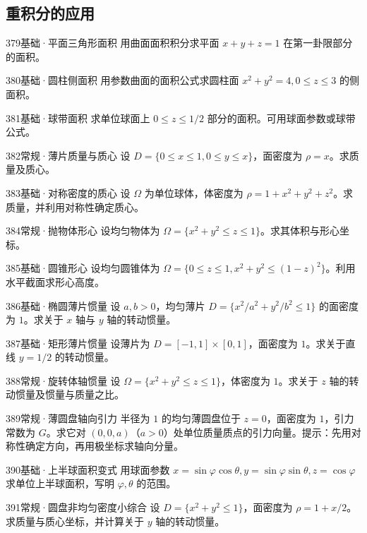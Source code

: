 \subsection{重积分的应用}
\begin{exercise}{379}{基础·平面三角形面积}
用曲面面积积分求平面 $x+y+z=1$ 在第一卦限部分的面积。
\end{exercise}
\begin{exercise}{380}{基础·圆柱侧面积}
用参数曲面的面积公式求圆柱面 $x^2+y^2=4,0\leq z\leq3$ 的侧面积。
\end{exercise}
\begin{exercise}{381}{基础·球带面积}
求单位球面上 $0\leq z\leq1/2$ 部分的面积。可用球面参数或球带公式。
\end{exercise}
\begin{exercise}{382}{常规·薄片质量与质心}
设 $D=\{0\leq x\leq1,0\leq y\leq x\}$，面密度为 $\rho=x$。求质量及质心。
\end{exercise}
\begin{exercise}{383}{基础·对称密度的质心}
设 $\Omega$ 为单位球体，体密度为 $\rho=1+x^2+y^2+z^2$。求质量，并利用对称性确定质心。
\end{exercise}
\begin{exercise}{384}{常规·抛物体形心}
设均匀物体为 $\Omega=\{x^2+y^2\leq z\leq1\}$。求其体积与形心坐标。
\end{exercise}
\begin{exercise}{385}{基础·圆锥形心}
设均匀圆锥体为 $\Omega=\{0\leq z\leq1,x^2+y^2\leq(1-z)^2\}$。利用水平截面求形心高度。
\end{exercise}
\begin{exercise}{386}{基础·椭圆薄片惯量}
设 $a,b>0$，均匀薄片 $D=\{x^2/a^2+y^2/b^2\leq1\}$ 的面密度为 $1$。求关于 $x$ 轴与 $y$ 轴的转动惯量。
\end{exercise}
\begin{exercise}{387}{基础·矩形薄片惯量}
设薄片为 $D=[-1,1]\times[0,1]$，面密度为 $1$。求关于直线 $y=1/2$ 的转动惯量。
\end{exercise}
\begin{exercise}{388}{常规·旋转体轴惯量}
设 $\Omega=\{x^2+y^2\leq z\leq1\}$，体密度为 $1$。求关于 $z$ 轴的转动惯量及惯量与质量之比。
\end{exercise}
\begin{exercise}{389}{常规·薄圆盘轴向引力}
半径为 $1$ 的均匀薄圆盘位于 $z=0$，面密度为 $1$，引力常数为 $G$。求它对 $(0,0,a)$（$a>0$）处单位质量质点的引力向量。提示：先用对称性确定方向，再用极坐标求轴向分量。
\end{exercise}
\begin{exercise}{390}{基础·上半球面积变式}
用球面参数 $x=\sin\varphi\cos\theta,y=\sin\varphi\sin\theta,z=\cos\varphi$ 求单位上半球面积，写明 $\varphi,\theta$ 的范围。
\end{exercise}
\begin{exercise}{391}{常规·圆盘非均匀密度小综合}
设 $D=\{x^2+y^2\leq1\}$，面密度为 $\rho=1+x/2$。求质量与质心坐标，并计算关于 $y$ 轴的转动惯量。
\end{exercise}
